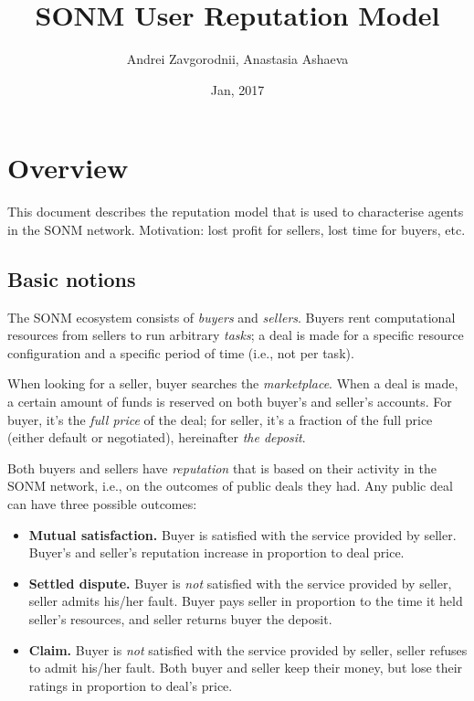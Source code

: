 \documentclass[11pt]{article}
\title{SONM User Reputation Model}
\author{Andrei Zavgorodnii, Anastasia Ashaeva}
\date{Jan, 2017}
\begin{document}
\maketitle
\tableofcontents
 
\section{Overview} \label{overview}

This document describes the reputation model that is used to characterise agents in the SONM network. Motivation: lost profit for sellers, lost time for buyers, etc.

\subsection{Basic notions} \label{basicNotions}

The SONM ecosystem consists of \textit{buyers} and \textit{sellers}. Buyers rent computational resources from sellers to run arbitrary \textit{tasks}; a deal is made for a specific resource configuration and a specific period of time (i.e., not per task).

When looking for a seller, buyer searches the \textit{marketplace}. When a deal is made, a certain amount of funds is reserved on both buyer's and seller's accounts. For buyer, it's the \textit{full price} of the deal; for seller, it's a fraction of the full price (either default or negotiated), hereinafter \textit{the deposit}.

Both buyers and sellers have \textit{reputation} that is based on their activity in the SONM network, i.e., on the outcomes of public deals they had. Any public deal can have three possible outcomes:

\begin{itemize}
\item \textbf{Mutual satisfaction.} Buyer is satisfied with the service provided by seller. Buyer's and seller's reputation increase in proportion to deal price.
\item \textbf{Settled dispute.} Buyer is \textit{not} satisfied with the service provided by seller, seller admits his/her fault. Buyer pays seller in proportion to the time it held seller's resources, and seller returns buyer the deposit.
\item \textbf{Claim.} Buyer is \textit{not} satisfied with the service provided by seller, seller refuses to admit his/her fault. Both buyer and seller keep their money, but lose their ratings in proportion to deal's price.
\end{itemize}
\end{document}
